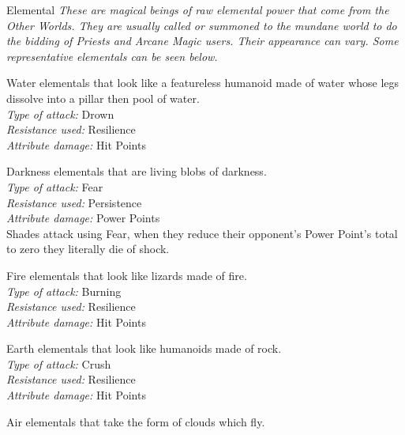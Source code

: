 \newpage

\begin{monsterbox}{Elemental}
\label{monster:elemental}
	\textit{These are magical beings of raw elemental power that come from the Other Worlds. They are usually called or summoned to the mundane world to do the bidding of Priests and Arcane Magic users. Their appearance can vary. Some representative elementals can be seen below.}\\
	\rpghline
	\begin{rpg-monsteraction}[Undines]
		Water elementals that look like a featureless humanoid made of water whose legs dissolve into a pillar then pool of water.\\
		\textit{Type of attack:} Drown\\
		\textit{Resistance used:} Resilience\\
		\textit{Attribute damage:} Hit Points
	\end{rpg-monsteraction}
	\begin{rpg-monsteraction}[Shades]
    		Darkness elementals that are living blobs of darkness.\\
		\textit{Type of attack:} Fear\\
		\textit{Resistance used:} Persistence\\
		\textit{Attribute damage:} Power Points\\
		Shades attack using Fear, when they reduce their opponent’s Power Point’s total to zero they literally die of shock.
	\end{rpg-monsteraction}
	\begin{rpg-monsteraction}[Salamanders]
		Fire elementals that look like lizards made of fire.\\
		\textit{Type of attack:} Burning\\
		\textit{Resistance used:} Resilience\\
		\textit{Attribute damage:} Hit Points
	\end{rpg-monsteraction}
	\begin{rpg-monsteraction}[Gnomes]
		Earth elementals that look like humanoids made of rock.\\
		\textit{Type of attack:} Crush\\
		\textit{Resistance used:} Resilience\\
		\textit{Attribute damage:} Hit Points
	\end{rpg-monsteraction}
	\begin{rpg-monsteraction}[Sylphs]
		Air elementals that take the form of clouds which fly.\\

\end{rpg-monsteraction}
\end{monsterbox}
